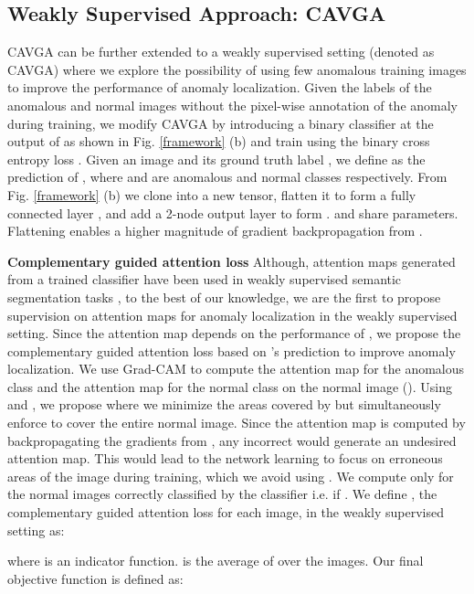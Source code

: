 \documentclass[runningheads]{llncs}
\begin{document}
\subsection{Weakly Supervised Approach: CAVGA}
\label{weakSuper}
CAVGA can be further extended to a weakly supervised setting (denoted as CAVGA) where we explore the possibility of using few anomalous training images to improve the performance of anomaly localization. Given the labels of the anomalous and normal images without the pixel-wise annotation of the anomaly during training, we modify CAVGA by introducing a binary classifier  at the output of  as shown in Fig. \ref{framework} (b) and train  using the binary cross entropy loss . Given an image  and its ground truth label , we define  as the prediction of , where  and  are anomalous and normal classes respectively. From Fig. \ref{framework} (b) we clone  into a new tensor, flatten it to form a fully connected layer , and add a 2-node output layer to form .  and  share parameters.  Flattening  enables a higher magnitude of gradient backpropagation from  \cite{selvaraju2017grad}. 

\textbf{Complementary guided attention loss } Although, attention maps generated from a trained classifier have been used in weakly supervised semantic segmentation tasks \cite{selvaraju2017grad,oquab2015object}, to the best of our knowledge, we are the first to propose supervision on attention maps for anomaly localization in the weakly supervised setting. Since the attention map depends on the performance of  \cite{li2018tell}, we propose the complementary guided attention loss  based on 's prediction to improve anomaly localization. We use Grad-CAM to compute the attention map for the anomalous class  and the attention map for the normal class  on the normal image  (). Using  and , we propose  where we minimize the areas covered by  but simultaneously enforce  to cover the entire normal image. Since the attention map is computed by backpropagating the gradients from , any incorrect  would generate an undesired attention map. This would lead to the network learning to focus on erroneous areas of the image during training, which we avoid using . We compute  only for the normal images correctly classified by the classifier i.e. if . We define , the complementary guided attention loss for each image, in the weakly supervised setting as:

where  is an indicator function.  is the average of  over the  images. Our final objective function  is defined as:
\end{document}
